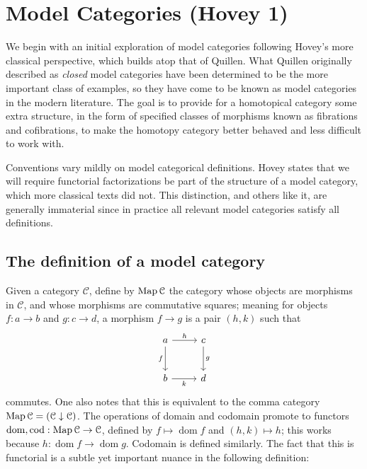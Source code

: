 \chapter{Model Categories (Hovey 1)}

We begin with an initial exploration of model categories following Hovey's more classical perspective, which builds atop that of Quillen. What Quillen originally described as \emph{closed} model categories have been determined to be the more important class of examples, so they have come to be known as model categories in the modern literature. The goal is to provide for a homotopical category some extra structure, in the form of specified classes of morphisms known as fibrations and cofibrations, to make the homotopy category better behaved and less difficult to work with.

Conventions vary mildly on model categorical definitions. Hovey states that we will require functorial factorizations be part of the structure of a model category, which more classical texts did not. This distinction, and others like it, are generally immaterial since in practice all relevant model categories satisfy all definitions.

\section{The definition of a model category}

Given a category $\mathcal{C} $, define by $\operatorname{Map} \mathcal{C} $ the category whose objects are morphisms in $\mathcal{C} $, and whose morphisms are commutative squares; meaning for objects $f : a \to b$ and $g : c \to d$, a morphism $f\to g$ is a pair $(h,k)$ such that
\[\begin{tikzcd}[row sep = 2.5em, column sep = 2.5em]
a\ar[" f "', d] \ar[" h ", r]  & c\ar[" g ", d]  \\
b \ar[" k "', r]  & d
\end{tikzcd}\]
commutes. One also notes that this is equivalent to the comma category $\operatorname{Map} \mathcal{C} =(\mathcal{C} \downarrow \mathcal{C} )$. The operations of domain and codomain promote to functors $\operatorname{dom} ,\operatorname{cod} : \operatorname{Map} \mathcal{C}  \to \mathcal{C} $, defined by $f\mapsto \operatorname{dom} f$ and $(h,k)\mapsto h$; this works because $h : \operatorname{dom} f \to \operatorname{dom} g$. Codomain is defined similarly. The fact that this is functorial is a subtle yet important nuance in the following definition:

